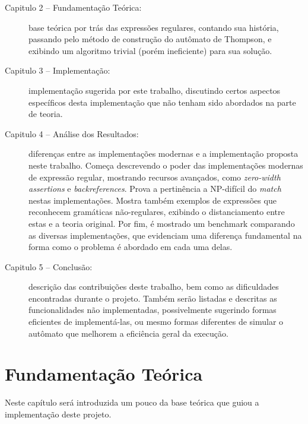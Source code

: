 \documentclass[a4paper,12pt,oneside,onecolumn]{uerj}
\begin{document}
\begin{description}

\item[Capitulo 2 -- Fundamentação Teórica:] base teórica por trás das expressões regulares, contando sua história, passando pelo método de construção do autômato de Thompson, e exibindo um algoritmo trivial (porém ineficiente) para sua solução.

\item[Capitulo 3 -- Implementação:] implementação sugerida por este trabalho, discutindo certos aspectos específicos desta implementação que não tenham sido abordados na parte de teoria. 

\item[Capitulo 4 -- Análise dos Resultados:] diferenças entre as implementações modernas e a implementação proposta neste trabalho. Começa descrevendo o poder das implementações modernas de expressão regular, mostrando recursos avançados, como \emph{zero-width assertions} e \emph{backreferences}. Prova a pertinência a NP-difícil do \emph{match} nestas implementações. Mostra também exemplos de expressões que reconhecem gramáticas não-regulares, exibindo o distanciamento entre estas e a teoria original. Por fim, é mostrado um benchmark comparando as diversas implementações, que evidenciam uma diferença fundamental na forma como o problema é abordado em cada uma delas. 

\item[Capitulo 5 -- Conclusão:] descrição das contribuições deste trabalho, bem como as dificuldades encontradas durante o projeto. Também serão listadas e descritas as funcionalidades não implementadas, possivelmente sugerindo formas eficientes de implementá-las, ou mesmo formas diferentes de simular o autômato que melhorem a eficiência geral da execução. 

\end{description}

\chapter{Fundamentação Teórica}\label{cap:theory}

Neste capítulo será introduzida um pouco da base teórica que guiou a implementação deste projeto.

\end{document}
